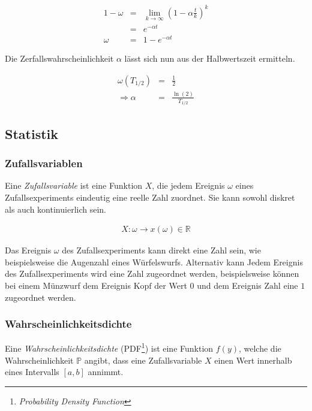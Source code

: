 \documentclass[12pt,a4paper]{scrartcl}
\numberwithin{equation}{section} %
\begin{document}
\begin{eqnarray}
	1 - \omega &=& \lim_{k \rightarrow \infty} \left(1 - \alpha \frac{t}{k} \right)^k \\
		&=& e^{- \alpha t} \\
	\omega &=& 1 - e^{-\alpha t}
\end{eqnarray}

\noindent
Die Zerfallswahrscheinlichkeit $\alpha$ lässt sich nun aus der Halbwertszeit ermitteln.

\begin{eqnarray}
	\omega(T_{1/2}) &=& \frac{1}{2} \\
	\Rightarrow\alpha &=& \frac{\ln{(2)}}{T_{1/2}}
\end{eqnarray}

\hypertarget{statistik}{\subsection{Statistik}\label{statistik}}

\subsubsection{Zufallsvariablen}
\label{Zufallsvariablen}
Eine \emph{Zufallsvariable} ist eine Funktion $X$, die jedem Ereignis $\omega$ eines Zufallsexperiments eindeutig eine reelle Zahl zuordnet. Sie kann sowohl diskret als auch kontinuierlich sein.

\begin{eqnarray}
	X : \omega \rightarrow x(\omega) \in \mathbb{R}
\end{eqnarray}

\noindent
Das Ereignis $\omega$ des Zufallsexperiments kann direkt eine Zahl sein, wie beispielsweise die Augenzahl eines Würfelswurfs. Alternativ kann Jedem Ereignis des Zufallsexperiments wird eine Zahl zugeordnet werden, beispielsweise können bei einem Münzwurf dem Ereignis $\mathrm{Kopf}$ der Wert $0$ und dem Ereignis $\mathrm{Zahl}$ eine $1$ zugeordnet werden.

\subsubsection{Wahrscheinlichkeitsdichte}
\label{Wahrscheinlichkeitsdichte}
Eine \textit{Wahrscheinlichkeitsdichte} (PDF\footnote{\emph{Probability Density Function}}) ist eine Funktion $f(y)$, welche die Wahrscheinlichkeit $\mathbb P$ angibt, dass eine Zufallsvariable $X$ einen Wert innerhalb eines Intervalls $[a,b]$ annimmt.
\end{document}
